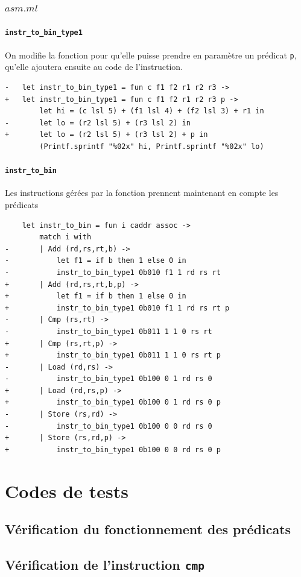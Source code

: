\documentclass[11pt, a4paper, twoside, titlepage]{article}
\begin{document}
\subsubsection{$asm.ml$}
\paragraph{\texttt{instr\_to\_bin\_type1}}
On modifie la fonction pour qu'elle puisse prendre en paramètre un prédicat \texttt{p}, qu'elle ajoutera ensuite au code de l'instruction.
\begin{lstlisting}
-	let instr_to_bin_type1 = fun c f1 f2 r1 r2 r3 ->
+	let instr_to_bin_type1 = fun c f1 f2 r1 r2 r3 p ->
		let hi = (c lsl 5) + (f1 lsl 4) + (f2 lsl 3) + r1 in
-		let lo = (r2 lsl 5) + (r3 lsl 2) in
+		let lo = (r2 lsl 5) + (r3 lsl 2) + p in
		(Printf.sprintf "%02x" hi, Printf.sprintf "%02x" lo)
\end{lstlisting}
\paragraph{\texttt{instr\_to\_bin}}
Les instructions gérées par la fonction prennent maintenant en compte les prédicats
\begin{lstlisting}
	let instr_to_bin = fun i caddr assoc ->
		match i with
-		| Add (rd,rs,rt,b) ->
-			let f1 = if b then 1 else 0 in
-			instr_to_bin_type1 0b010 f1 1 rd rs rt
+		| Add (rd,rs,rt,b,p) ->
+			let f1 = if b then 1 else 0 in
+			instr_to_bin_type1 0b010 f1 1 rd rs rt p
-		| Cmp (rs,rt) ->
-			instr_to_bin_type1 0b011 1 1 0 rs rt
+		| Cmp (rs,rt,p) ->
+			instr_to_bin_type1 0b011 1 1 0 rs rt p
-		| Load (rd,rs) ->
-			instr_to_bin_type1 0b100 0 1 rd rs 0
+		| Load (rd,rs,p) ->
+			instr_to_bin_type1 0b100 0 1 rd rs 0 p
-		| Store (rs,rd) ->
-			instr_to_bin_type1 0b100 0 0 rd rs 0
+		| Store (rs,rd,p) ->
+			instr_to_bin_type1 0b100 0 0 rd rs 0 p
\end{lstlisting}

\section{Codes de tests}

\subsection{Vérification du fonctionnement des prédicats}


\subsection{Vérification de l'instruction \texttt{cmp}}

\end{document}
